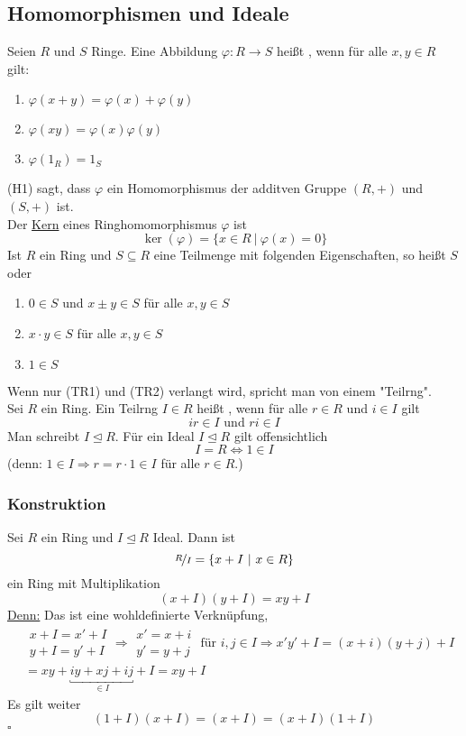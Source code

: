 \subsection{Homomorphismen und Ideale}
\label{sub:homomor_ideale}
Seien $R$ und $S$ Ringe. 
Eine Abbildung $\varphi:R\to S$ heißt , wenn für alle $x,y\in R$ gilt:
\begin{enumerate}[(H1)]
	\item $\varphi(x+y)=\varphi(x)+\varphi(y)$
	\item $\varphi(xy)=\varphi(x)\varphi(y)$
	\item $\varphi(1_R)=1_S$
\end{enumerate}
(H1) sagt, dass $\varphi$ ein Homomorphismus der additven Gruppe $(R,+)$ und $(S,+)$ ist.\\
Der \uline{Kern} eines Ringhomomorphismus $\varphi$ ist
\[
\ker(\varphi)=\{x\in R~|~\varphi(x)=0 \}
\]
Ist $R$ ein Ring und $S\subseteq R$ eine Teilmenge mit folgenden Eigenschaften, so heißt $S$  oder 
\begin{enumerate}[(TR1)]
	\item $0\in S$ und $x\pm y\in S$ für alle $x,y\in S$
	\item $x\cdot y\in S$ für alle $x,y\in S$
	\item $1\in S$
\end{enumerate}
Wenn nur (TR1) und (TR2) verlangt wird, spricht man von einem "Teilrng".\\
Sei $R$ ein Ring. 
Ein Teilrng $I\in R$ heißt , wenn für alle $r\in R$ und $i\in I$ gilt
\[
ir\in I \text{ und } ri\in I
\]
Man schreibt $I\trianglelefteq R$.
Für ein Ideal $I\trianglelefteq R$ gilt offensichtlich
\[
I=R\Leftrightarrow 1\in I
\]
(denn: $1\in I\Rightarrow r=r\cdot 1\in I$ für alle $r\in R$.)

\subsubsection*{Konstruktion}
Sei $R$ ein Ring und $I\trianglelefteq R$ Ideal. 
Dann ist 
\[
\nicefrac{R}{I}=\{x+I~|~x\in R\}
\]
ein Ring mit Multiplikation
\[
(x+I)(y+I)=xy+I
\]
\uline{Denn:} Das ist eine wohldefinierte Verknüpfung,\\
\begin{equation*}
\begin{aligned}
&\begin{array}{c} x+I=x'+I\\ y+I=y'+I    \end{array} \Rightarrow \begin{array}{c} x'=x+i\\y'=y+j \end{array} \text{ für } i,j\in I \Rightarrow x'y'+I=(x+i)(y+j)+I\\
&= xy+\underbracket{iy+xj+ij}_{\in I}+I=xy+I
\end{aligned}
\end{equation*}
Es gilt weiter
\[
(1+I)(x+I)=(x+I)=(x+I)(1+I)
\]
\hfill $\square$

